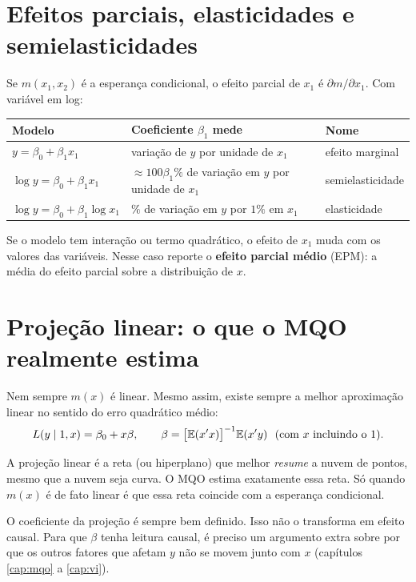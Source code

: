 \section{Efeitos parciais, elasticidades e semielasticidades}
Se $m(x_1,x_2)$ é a esperança condicional, o efeito parcial de $x_1$ é $\partial m/\partial x_1$. Com variável em log:
\begin{center}
\small
\begin{tabular}{lll}
\toprule
\textbf{Modelo} & \textbf{Coeficiente $\beta_1$ mede} & \textbf{Nome} \\
\midrule
$y=\beta_0+\beta_1x_1$ & variação de $y$ por unidade de $x_1$ & efeito marginal \\
$\log y=\beta_0+\beta_1 x_1$ & $\approx 100\beta_1\%$ de variação em $y$ por unidade de $x_1$ & semielasticidade \\
$\log y=\beta_0+\beta_1\log x_1$ & $\%$ de variação em $y$ por $1\%$ em $x_1$ & elasticidade \\
\bottomrule
\end{tabular}
\end{center}
Se o modelo tem interação ou termo quadrático, o efeito de $x_1$ muda com os valores das variáveis. Nesse caso reporte o \textbf{efeito parcial médio} (EPM): a média do efeito parcial sobre a distribuição de $x$.

\section{Projeção linear: o que o MQO realmente estima}
Nem sempre $m(x)$ é linear. Mesmo assim, existe sempre a melhor aproximação linear no sentido do erro quadrático médio:
\[
L(y\mid 1,x)=\beta_0+x\beta,\qquad \beta=\big[\E(x'x)\big]^{-1}\E(x'y)\ \ (\text{com } x \text{ incluindo o 1}).
\]
\begin{intuicao}
A projeção linear é a reta (ou hiperplano) que melhor \emph{resume} a nuvem de pontos, mesmo que a nuvem seja curva. O MQO estima exatamente essa reta. Só quando $m(x)$ é de fato linear é que essa reta coincide com a esperança condicional.
\end{intuicao}

\begin{atencao}
O coeficiente da projeção é sempre bem definido. Isso não o transforma em efeito causal. Para que $\beta$ tenha leitura causal, é preciso um argumento extra sobre por que os outros fatores que afetam $y$ não se movem junto com $x$ (capítulos \ref{cap:mqo} a \ref{cap:vi}).
\end{atencao}

